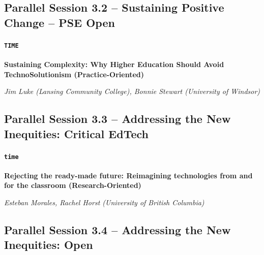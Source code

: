 \documentclass[
]{book}
\begin{document}
\hypertarget{parallel-session-3.2-sustaining-positive-change-pse-open}{%
\subsection*{Parallel Session 3.2 -- Sustaining Positive Change -- PSE Open}\label{parallel-session-3.2-sustaining-positive-change-pse-open}}

\begin{secondary}
\hypertarget{time}{%
\paragraph{\texorpdfstring{\texttt{TIME}}{TIME}}\label{time}}

\textbf{Sustaining Complexity: Why Higher Education Should Avoid
TechnoSolutionism (Practice-Oriented)}

\emph{Jim Luke (Lansing Community College), Bonnie Stewart (University
of Windsor)}
\end{secondary}

\hypertarget{parallel-session-3.3-addressing-the-new-inequities-critical-edtech}{%
\subsection*{Parallel Session 3.3 -- Addressing the New Inequities: Critical EdTech}\label{parallel-session-3.3-addressing-the-new-inequities-critical-edtech}}

\begin{secondary}
\hypertarget{time}{%
\paragraph{\texorpdfstring{\texttt{time}}{time}}\label{time}}

\textbf{Rejecting the ready-made future: Reimagining technologies from
and for the classroom (Research-Oriented)}

\emph{Esteban Morales, Rachel Horst (University of British Columbia)}
\end{secondary}

\hypertarget{parallel-session-3.4-addressing-the-new-inequities-open}{%
\subsection*{Parallel Session 3.4 -- Addressing the New Inequities: Open}\label{parallel-session-3.4-addressing-the-new-inequities-open}}
\end{document}
